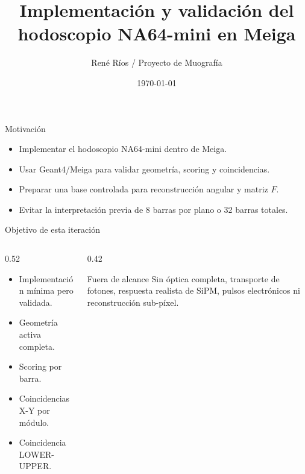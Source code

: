\documentclass[aspectratio=169]{beamer}
\title[NA64-mini en Meiga]{Implementación y validación del hodoscopio NA64-mini en Meiga}
\author{René Ríos / Proyecto de Muografía}
\institute{Universidad de La Serena}
\date{\today}
\begin{document}
\begin{frame}
  \titlepage
\end{frame}

\begin{frame}{Motivación}
  \begin{itemize}
    \item Implementar el hodoscopio NA64-mini dentro de Meiga.
    \item Usar Geant4/Meiga para validar geometría, scoring y coincidencias.
    \item Preparar una base controlada para reconstrucción angular y matriz \(F\).
    \item Evitar la interpretación previa de 8 barras por plano o 32 barras totales.
  \end{itemize}
\end{frame}

\begin{frame}{Objetivo de esta iteración}
  \begin{columns}[T]
    \begin{column}{0.52\textwidth}
      \begin{itemize}
        \item Implementación mínima pero validada.
        \item Geometría activa completa.
        \item Scoring por barra.
        \item Coincidencias X-Y por módulo.
        \item Coincidencia LOWER-UPPER.
      \end{itemize}
    \end{column}
    \begin{column}{0.42\textwidth}
      \begin{block}{Fuera de alcance}
        Sin óptica completa, transporte de fotones, respuesta realista de SiPM,
        pulsos electrónicos ni reconstrucción sub-píxel.
      \end{block}
    \end{column}
  \end{columns}
\end{frame}
\end{document}
